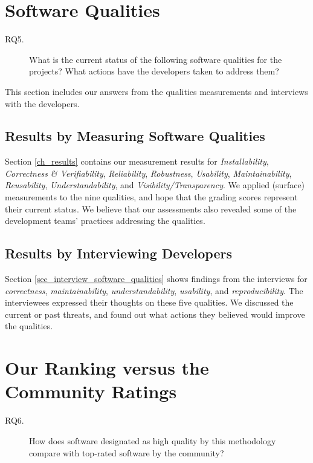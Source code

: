 \section{Software Qualities}
\label{sec_rq_qualities}
\begin{description}\item[RQ5.] What is the current status of the following software qualities for the projects? What actions have the developers taken to address them?\end{description}

This section includes our answers from the qualities measurements and interviews with the developers.

\subsection{Results by Measuring Software Qualities}
Section \ref{ch_results} contains our measurement results for \textit{Installability}, \textit{Correctness \& Verifiability}, \textit{Reliability}, \textit{Robustness}, \textit{Usability}, \textit{Maintainability}, \textit{Reusability}, \textit{Understandability}, and \textit{Visibility/Transparency}. We applied (surface) measurements to the nine qualities, and hope that the grading scores represent their current status. We believe that our assessments also revealed some of the development teams' practices addressing the qualities. 

\subsection{Results by Interviewing Developers}
Section \ref{sec_interview_software_qualities} shows findings from the interviews for \textit{correctness}, \textit{maintainability}, \textit{understandability}, \textit{usability}, and \textit{reproducibility}. The interviewees expressed their thoughts on these five qualities. We discussed the current or past threats, and found out what actions they believed would improve the qualities.

\section{Our Ranking versus the Community Ratings}
\label{sec_rq_comparison}
\begin{description}
\item[RQ6.] How does software designated as high quality by this methodology compare with top-rated software by the community?
\end{description}

